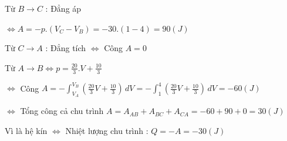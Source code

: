 \documentclass[12pt,a4paper]{article}
\begin{document}
\vspace*{1cm}
Từ $B \rightarrow C$ : Đẳng áp 

\vspace*{1cm}
$\Leftrightarrow A = -p.(V_C - V_B) = -30.(1-4) = 90 (J)$

\vspace*{1cm}
Từ $C \rightarrow A$ : Đẳng tích $\Leftrightarrow $ Công $A = 0$

\vspace*{1cm}
Từ $A \rightarrow B \Leftrightarrow p = \frac{20}{3}.V + \frac{10}{3}$

\vspace*{1cm}
$\Leftrightarrow $ Công $ A = - \int_{V_A}^{V_B} (\frac{20}{3}V + \frac{10}{3}) \,dV = - \int_{1}^{4} (\frac{20}{3}V + \frac{10}{3}) \,dV  = -60 (J)$

\vspace*{1cm}
$\Leftrightarrow$ Tổng công cả chu trình $A = A_{AB} + A_{BC} + A_{CA} = -60 + 90 + 0 = 30 (J)$

\vspace*{1cm}
Vì là hệ kín $ \Leftrightarrow$ Nhiệt lượng chu trình : $ Q = - A = - 30 (J)$
\end{document}
